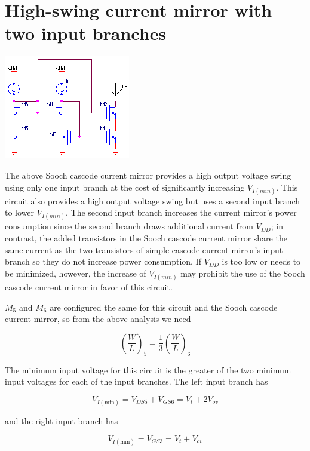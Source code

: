 \section{High-swing current mirror with two input branches}
\begin{center}
	\includegraphics{schematics/highswingcascodecurrentmirror.PNG}
\end{center}
The above Sooch cascode current mirror provides a high output voltage swing using only one input branch at the cost of significantly increasing $V_{I(min)}$.
This circuit also provides a high output voltage swing but uses a second input branch to lower $V_{I(min)}$.
The second input branch increases the current mirror's power consumption since the second branch draws additional current from $V_{DD}$;
in contrast, the added transistors in the Sooch cascode current mirror share the same current as the two transistors of simple cascode current mirror's input branch so they do not increase power consumption.
If $V_{DD}$ is too low or needs to be minimized, however, the increase of $V_{I(min)}$ may prohibit the use of the Sooch cascode current mirror in favor of this circuit.

$M_5$ and $M_6$ are configured the same for this circuit and the Sooch cascode current mirror, so from the above analysis we need

\begin{equation}
\left(\frac{W}{L}\right)_{5} = \frac{1}{3}\left(\frac{W}{L}\right)_{6}
\end{equation}

The minimum input voltage for this circuit is the greater of the two minimum input voltages for each of the input branches.
The left input branch has

\begin{equation}
V_{I(\text{min})} = V_{DS5} + V_{GS6} = V_{t} + 2V_{ov}
\end{equation}

and the right input branch has

\begin{equation}
V_{I(\text{min})} = V_{GS3} = V_{t} + V_{ov}
\end{equation}

